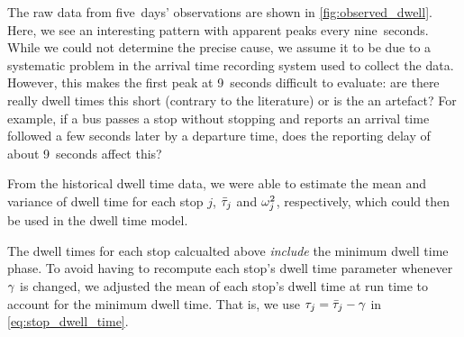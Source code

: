 
The raw data from five~days' observations are shown in \cref{fig:observed_dwell}. Here, we see an interesting pattern with apparent peaks every nine~seconds. While we could not determine the precise cause, we assume it to be due to a systematic problem in the arrival time recording system used to collect the data. However, this makes the first peak at 9~seconds difficult to evaluate: are there really dwell times this short (contrary to the literature) or is the an artefact? For example, if a bus passes a stop without stopping and reports an arrival time followed a few seconds later by a departure time, does the reporting delay of about 9~seconds affect this?

From the historical dwell time data, we were able to estimate the mean and variance of dwell time for each stop $j$, $\bar{\tau}_j$ and $\omega^2_j$, respectively, which could then be used in the dwell time model.


The dwell times for each stop calcualted above \emph{include} the minimum dwell time phase. To avoid having to recompute each stop's dwell time parameter whenever $\gamma$ is changed, we adjusted the mean of each stop's dwell time at run time to account for the minimum dwell time. That is, we use $\tau_j = \bar{\tau}_j - \gamma$ in \cref{eq:stop_dwell_time}.
